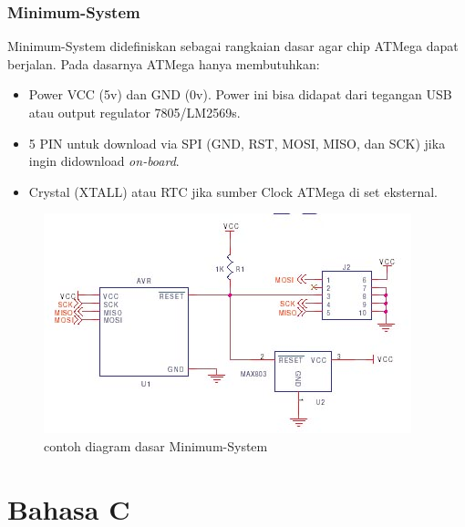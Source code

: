 \documentclass[12pt,]{article}
\begin{document}
	\subsubsection{Minimum-System}
	Minimum-System didefiniskan sebagai rangkaian dasar agar chip ATMega dapat berjalan.
	Pada dasarnya ATMega hanya membutuhkan:
	\begin{itemize}
		\item Power VCC (5v) dan GND (0v). Power ini bisa didapat dari tegangan USB atau output regulator 7805/LM2569s.
		\item 5 PIN untuk download via SPI (GND, RST, MOSI, MISO, dan SCK) jika ingin didownload \textit{on-board}.
		\item Crystal (XTALL) atau RTC jika sumber Clock ATMega di set eksternal.
	\end{itemize}

	\begin{figure}[H]
		\centering
		\includegraphics[width=0.6\linewidth]{images/minsys}
		\caption{contoh diagram dasar Minimum-System}
	\end{figure}

	\section{Bahasa C}
	
	
	
\end{document}
